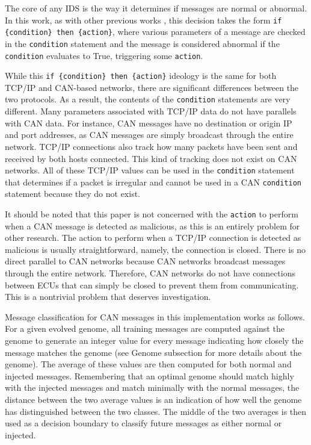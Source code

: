 \documentclass[10pt,conference]{IEEEtran}
\begin{document}
The core of any IDS is the way it determines if messages are normal or abnormal.  In this work, as with other previous works \cite{li2004using, hoque2012implementation}, this decision takes the form \texttt{if \{condition\} then \{action\}}, where various parameters of a message are checked in the \texttt{condition} statement and the message is considered abnormal if the \texttt{condition} evaluates to True, triggering some \texttt{action}. 

While this \texttt{if \{condition\} then \{action\}} ideology is the same for both TCP/IP and CAN-based networks, there are significant differences between the two protocols.  As a result, the contents of the \texttt{condition} statements are very different.  Many parameters associated with TCP/IP data do not have parallels with CAN data.  For instance, CAN messages have no destination or origin IP and port addresses, as CAN messages are simply broadcast through the entire network.  TCP/IP connections also track how many packets have been sent and received by both hosts connected.  This kind of tracking does not exist on CAN networks.  All of these TCP/IP values can be used in the \texttt{condition} statement that determines if a packet is irregular and cannot be used in a CAN \texttt{condition} statement because they do not exist.  

It should be noted that this paper is not concerned with the \texttt{action} to perform when a CAN message is detected as malicious, as this is an entirely problem for other research.  The action to perform when a TCP/IP connection is detected as malicious is usually straightforward, namely, the connection is closed.  There is no direct parallel to CAN networks because CAN networks broadcast messages through the entire network.  Therefore, CAN networks do not have connections between ECUs that can simply be closed to prevent them from communicating.  This is a nontrivial problem that deserves investigation.  

Message classification for CAN messages in this implementation works as follows.  For a given evolved genome, all training messages are computed against the genome to generate an integer value for every message indicating how closely the message matches the genome (see Genome subsection for more details about the genome).  The average of these values are then computed for both normal and injected messages.  Remembering that an optimal genome should match highly with the injected messages and match minimally with the normal messages, the distance between the two average values is an indication of how well the genome has distinguished between the two classes.  The middle of the two averages is then used as a decision boundary to classify future messages as either normal or injected.  
\end{document}
